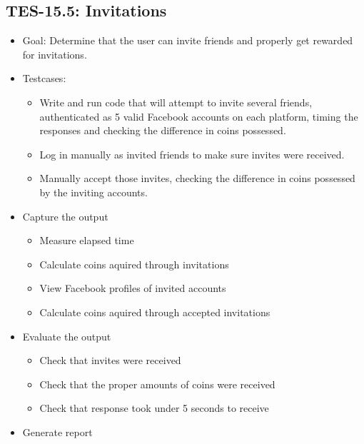 \subsection{TES-15.5: Invitations}
\begin{itemize}
\item Goal: Determine that the user can invite friends and properly get 
rewarded for invitations.
\item Testcases: 
\begin{itemize}
\item Write and run code that will attempt to invite several friends, 
authenticated as 5 valid Facebook accounts on each platform, 
timing the responses and checking the difference in coins possessed.
\item Log in manually as invited friends to make sure invites were received.
\item Manually accept those invites, checking the difference in coins 
possessed by the inviting accounts.
\end{itemize}
\item Capture the output 
\begin{itemize}
\item Measure elapsed time 
\item Calculate coins aquired through invitations
\item View Facebook profiles of invited accounts
\item Calculate coins aquired through accepted invitations
\end{itemize}
\item Evaluate the output 
\begin{itemize}
\item Check that invites were received
\item Check that the proper amounts of coins were received
\item Check that response took under 5 seconds to receive
\end{itemize}
\item Generate report 
\end{itemize}

